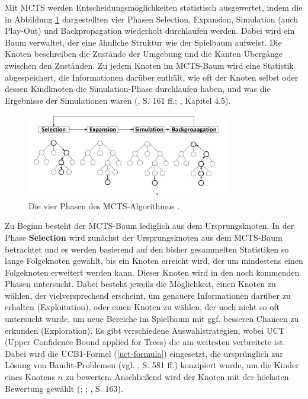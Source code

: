 
Mit MCTS werden Entscheidungsmöglichkeiten statistisch ausgewertet, indem die in Abbildung \ref{fig:f27} dargestellten vier Phasen Selection, Expansion, Simulation (auch Play-Out) und Backpropagation wiederholt durchlaufen werden. Dabei wird ein Baum verwaltet, der eine ähnliche Struktur wie der Spielbaum aufweist. Die Knoten beschreiben die Zustände der Umgebung und die Kanten Übergänge zwischen den Zuständen. Zu jedem Knoten im MCTS-Baum wird eine Statistik abgespeichert, die Informationen darüber enthält, wie oft der Knoten selbst oder dessen Kindknoten die Simulation-Phase durchlaufen haben, und was die Ergebnisse der Simulationen waren (\cite{Russell.2020}, S. 161 ff.; \cite{Ferguson.January2019}, Kapitel 4.5).

\begin{figure}[ht!]%
	\includegraphics[width=0.8\textwidth, center]{Bilder/mcts-phases.png}
	\caption[Die vier Phasen des MCTS-Algorithmus.]{Die vier Phasen des MCTS-Algorithmus \cite{Swiechowski.2021}.}
	\label{fig:f27}
\end{figure}

Zu Beginn besteht der MCTS-Baum lediglich aus dem Ursprungsknoten. In der Phase \textbf{Selection} wird zunächst der Ursprungsknoten aus dem MCTS-Baum betrachtet und es werden basierend auf den bisher gesammelten Statistiken so lange Folgeknoten gewählt, bis ein Knoten erreicht wird, der um mindestens einen Folgeknoten erweitert werden kann. Dieser Knoten wird in den noch kommenden Phasen untersucht. Dabei besteht jeweils die Möglichkeit, einen Knoten zu wählen, der vielversprechend erscheint, um genauere Informationen darüber zu erhalten (Exploitation), oder einen Knoten zu wählen, der noch nicht so oft untersucht wurde, um neue Bereiche im Spielbaum mit ggf. besseren Chancen zu erkunden (Exploration). Es gibt verschiedene Auswahlstrategien, wobei UCT (Upper Confidence Bound applied for Trees) die am weitesten verbreitete ist. Dabei wird die UCB1-Formel (\ref{uct-formula}) eingesetzt, die ursprünglich zur Lösung von Bandit-Problemen (vgl. \cite{Russell.2020}, S. 581 ff.) konzipiert wurde, um die Kinder eines Knotens $n$ zu bewerten. Anschließend wird der Knoten mit der höchsten Bewertung gewählt (\cite{Kocsis.2006}; \cite{Browne.2012}; \cite{Russell.2020}, S. 163).

